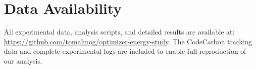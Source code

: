 \documentclass[conference]{IEEEtran}
\begin{document}
\section*{Data Availability}

All experimental data, analysis scripts, and detailed results are available at: \url{https://github.com/tomalmog/optimizer-energy-study}. The CodeCarbon tracking data and complete experimental logs are included to enable full reproduction of our analysis.

\balance


\end{document}
